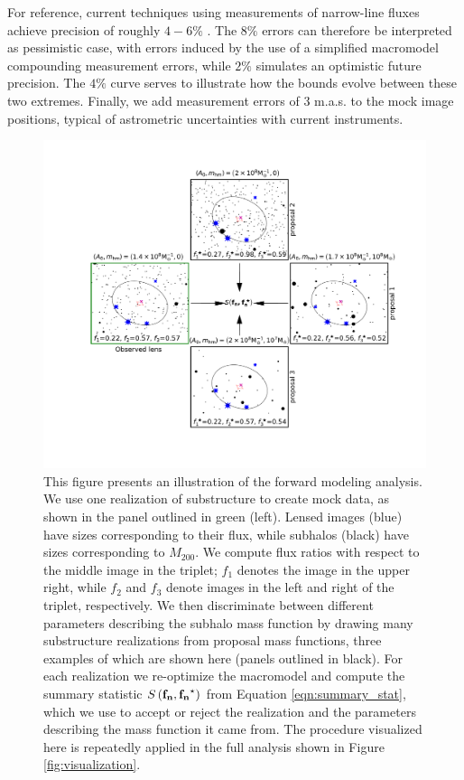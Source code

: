 For reference, current techniques using measurements of narrow-line fluxes achieve precision of roughly $4-6\%$ \cite{Nierenberg++14,Nierenberg++17}. The $8\%$ errors can therefore be interpreted as pessimistic case, with errors induced by the use of a simplified macromodel compounding measurement errors, while $2\%$ simulates an optimistic future precision. The $4\%$ curve serves to illustrate how the bounds evolve between these two extremes. Finally, we add measurement errors of 3 m.a.s. to the mock image positions, typical of astrometric uncertainties with current instruments.
\begin{figure}
	\centering
	\includegraphics[clip,trim=4.2cm 3.2cm 2.2cm
	2.7cm,width=.8\textwidth,keepaspectratio]{./figures_ABCforward/schematic.pdf}
	\caption{\label{fig:visualization2} This figure presents an illustration of the forward modeling analysis.  We use one realization of substructure to create mock data, as shown in the panel outlined in green (left). Lensed images (blue) have sizes corresponding to their flux, while subhalos (black) have sizes corresponding to $M_{200}$.  We compute flux ratios with respect to the middle image in the triplet; $f_1$ denotes the image in the upper right, while $f_2$ and $f_3$ denote images in the left and right of the triplet, respectively. We then discriminate between different parameters describing the subhalo mass function by drawing many substructure realizations from proposal mass functions, three examples of which are shown here (panels outlined in black). For each realization we re-optimize the macromodel and compute the summary statistic $S\left({\bf{f_n}},{\bf{f_n}^{\star}}\right)$ from Equation \ref{eqn:summary_stat}, which we use to accept or reject the realization and the parameters describing the mass function it came from. The procedure visualized here is repeatedly applied in the full analysis shown in Figure \ref{fig:visualization}. 
	}
\end{figure}

